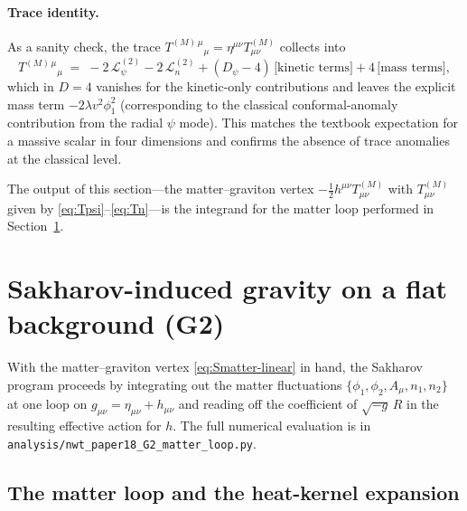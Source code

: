 \documentclass[11pt]{article}
\begin{document}
\paragraph{Trace identity.}  As a sanity check, the trace
$T^{(M){\,\mu}}{}_\mu = \eta^{\mu\nu} T^{(M)}_{\mu\nu}$ collects
into
\begin{equation}
  T^{(M){\,\mu}}{}_\mu
  \;=\; -2\,\mathcal{L}^{(2)}_\psi - 2\,\mathcal{L}^{(2)}_n
        + (D_\psi - 4)\,\big[\text{kinetic terms}\big]
        + 4\,\big[\text{mass terms}\big],
\end{equation}
which in $D=4$ vanishes for the kinetic-only contributions and
leaves the explicit mass term $-2 \lambda v^2 \phi_1^2$
(corresponding to the classical conformal-anomaly contribution from
the radial $\psi$ mode).  This matches the textbook expectation
for a massive scalar in four dimensions and confirms the absence
of trace anomalies at the classical level.

The output of this section---the matter--graviton vertex
$-\tfrac{1}{2} h^{\mu\nu} T^{(M)}_{\mu\nu}$ with $T^{(M)}_{\mu\nu}$
given by \eqref{eq:Tpsi}--\eqref{eq:Tn}---is the integrand for the
matter loop performed in Section~\ref{sec:G2-flat-sakharov}.

\section{Sakharov-induced gravity on a flat background (G2)}
\label{sec:G2-flat-sakharov}

With the matter--graviton vertex \eqref{eq:Smatter-linear} in hand,
the Sakharov program proceeds by integrating out the matter
fluctuations $\{\phi_1, \phi_2, A_\mu, n_1, n_2\}$ at one loop on
$g_{\mu\nu} = \eta_{\mu\nu} + h_{\mu\nu}$ and reading off the
coefficient of $\sqrt{-g}\,R$ in the resulting effective action for
$h$.  The full numerical evaluation is in
\texttt{analysis/nwt\_paper18\_G2\_matter\_loop.py}.

\subsection{The matter loop and the heat-kernel expansion}
\end{document}
